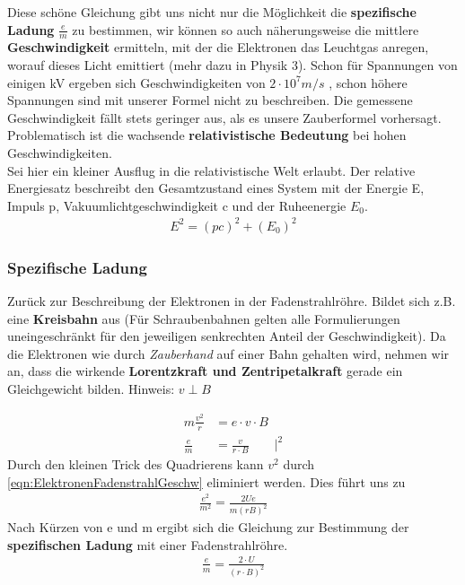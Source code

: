 Diese schöne Gleichung gibt uns nicht nur die Möglichkeit die\textbf{ spezifische Ladung} $\tfrac{e}{m}$ zu bestimmen, wir können so auch näherungsweise die mittlere \textbf{Geschwindigkeit} ermitteln, mit der die Elektronen das Leuchtgas anregen, worauf dieses Licht emittiert (mehr dazu in Physik 3). Schon für Spannungen von einigen kV ergeben sich Geschwindigkeiten von $2 \cdot 10^{7} m/s$ , schon höhere Spannungen sind mit unserer Formel nicht zu beschreiben.
Die gemessene Geschwindigkeit fällt stets geringer aus, als es unsere Zauberformel vorhersagt.  Problematisch ist die wachsende \textbf{relativistische Bedeutung} bei hohen Geschwindigkeiten.
\\ Sei hier ein kleiner Ausflug in die relativistische Welt erlaubt. Der relative Energiesatz beschreibt den Gesamtzustand eines System mit der Energie E, Impuls p, Vakuumlichtgeschwindigkeit c und der Ruheenergie $E_0$.
\begin{align} \label{eqn:relEnergiesatz}
E^2 = (pc)^2 + (E_0)^2
\end{align}

\subsubsection{Spezifische Ladung}
Zurück zur Beschreibung der Elektronen in der Fadenstrahlröhre. Bildet sich z.B. eine \textbf{Kreisbahn} aus (Für Schraubenbahnen gelten alle Formulierungen uneingeschränkt für den jeweiligen senkrechten Anteil der Geschwindigkeit).
Da die Elektronen wie durch \textit{Zauberhand} auf einer Bahn gehalten wird, nehmen wir an, dass die wirkende \textbf{Lorentzkraft und Zentripetalkraft} gerade ein Gleichgewicht bilden. Hinweis: $v \perp B$

\begin{align} \label{eqn:Ansatz Fadenstrahlröhre}
m \frac{v^2}{r} 	&= e \cdot v \cdot B \\ 
\frac{e}{m}			&= \frac{v}{r \cdot B} \qquad  \bigg|^2
\end{align}Durch den kleinen Trick des Quadrierens  kann $v^2$ durch \ref{eqn:ElektronenFadenstrahlGeschw} eliminiert werden. Dies führt uns zu 
\begin{align*}
\frac{e^2}{m^2} = \frac{2Ue}{m(rB)^2}
\end{align*}Nach Kürzen von e und m ergibt sich die Gleichung zur Bestimmung der \textbf{spezifischen Ladung} mit einer Fadenstrahlröhre.
\begin{align} \label{eqn:spezifischeLadung}
\boxed{\frac{e}{m} = \frac{2 \cdot U }{\left(r \cdot B \right)^2}}
\end{align}
